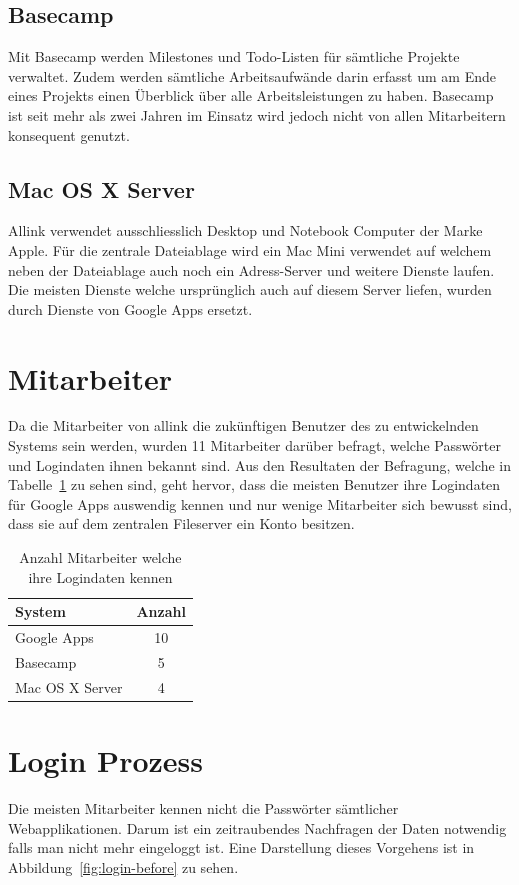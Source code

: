 \subsection{Basecamp}
\label{subs:Basecamp}
Mit Basecamp werden Milestones und Todo-Listen für sämtliche Projekte verwaltet. Zudem werden sämtliche Arbeitsaufwände darin erfasst um am Ende eines Projekts einen Überblick über alle Arbeitsleistungen zu haben. Basecamp ist seit mehr als zwei Jahren im Einsatz wird jedoch nicht von allen Mitarbeitern konsequent genutzt.

\subsection{Mac OS X Server}
\label{subs:Mac OS X Server}
Allink verwendet ausschliesslich Desktop und Notebook Computer der Marke Apple. Für die zentrale Dateiablage wird ein Mac Mini verwendet auf welchem neben der Dateiablage auch noch ein Adress-Server und weitere Dienste laufen. Die meisten Dienste welche ursprünglich auch auf diesem Server liefen, wurden durch Dienste von Google Apps ersetzt.

\section{Mitarbeiter}
\label{sec:Mitarbeiter}
Da die Mitarbeiter von allink die zukünftigen Benutzer des zu entwickelnden Systems sein werden, wurden 11 Mitarbeiter darüber befragt, welche Passwörter und Logindaten ihnen bekannt sind. Aus den Resultaten der Befragung, welche in Tabelle~\ref{tab:umfrage_passworter} zu sehen sind, geht hervor, dass die meisten Benutzer ihre Logindaten für Google Apps auswendig kennen und nur wenige Mitarbeiter sich bewusst sind, dass sie auf dem zentralen Fileserver ein Konto besitzen.

\begin{table}
  \centering
  \begin{tabular}
  	{|l | c|} \hline System & Anzahl\\
  	\hline Google Apps & 10\\
  	\hline Basecamp & 5\\
  	\hline Mac OS X Server & 4\\
  	\hline 
  \end{tabular}
  \caption{Anzahl Mitarbeiter welche ihre Logindaten kennen}
  \label{tab:umfrage_passworter}
\end{table}

\section{Login Prozess}
\label{sec:Login Prozess}
Die meisten Mitarbeiter kennen nicht die Passwörter sämtlicher Webapplikationen. Darum ist ein zeitraubendes Nachfragen der Daten notwendig falls man nicht mehr eingeloggt ist. Eine Darstellung dieses Vorgehens ist in Abbildung~\ref{fig:login-before} zu sehen.

